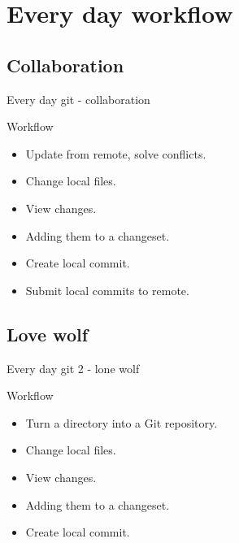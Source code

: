 \documentclass{beamer}
\begin{document}

\section{Every day workflow}

\subsection{Collaboration}

\begin{frame}{Every day git - collaboration}

\begin{block}{Workflow}
\begin{itemize}
 \item Update from remote, solve conflicts.
 \item Change local files.
 \item View changes.
 \item Adding them to a changeset.
 \item Create local commit.
 \item Submit local commits to remote.
\end{itemize}
\end{block}

\end{frame}


\subsection{Love wolf}

\begin{frame}{Every day git 2 - lone wolf}

\begin{block}{Workflow}
\begin{itemize}
 \item Turn a directory into a Git repository.
 \item Change local files.
 \item View changes.
 \item Adding them to a changeset.
 \item Create local commit.
\end{itemize}
\end{block}

\end{frame}
\end{document}
